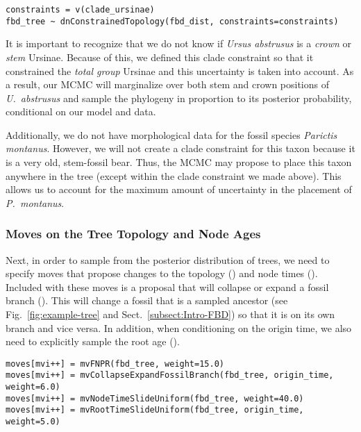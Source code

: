 {\tt \begin{snugshade*}
\begin{lstlisting}
constraints = v(clade_ursinae)
fbd_tree ~ dnConstrainedTopology(fbd_dist, constraints=constraints)
\end{lstlisting}
\end{snugshade*}}

It is important to recognize that we do not know if \textit{Ursus abstrusus} is a \textit{crown} or \textit{stem} Ursinae. 
Because of this, we defined this clade constraint so that it constrained the \textit{total group} Ursinae and this uncertainty is taken into account.
As a result, our MCMC will marginalize over both stem and crown positions of \textit{U.\ abstrusus} and sample the phylogeny in proportion to its posterior probability, conditional on our model and data.

Additionally, we do not have morphological data for the fossil species \textit{Parictis montanus}.
However, we will not create a clade constraint for this taxon because it is a very old, stem-fossil bear. 
Thus, the MCMC may propose to place this taxon anywhere in the tree (except within the clade constraint we made above). 
This allows us to account for the maximum amount of uncertainty in the placement of \textit{P.\ montanus}.

\subsubsection{Moves on the Tree Topology and Node Ages}\label{subsub:Exercise-FBD-TreeMoves}

Next, in order to sample from the posterior distribution of trees, we need to specify moves that propose changes to the topology () and node times ().
Included with these moves is a proposal that will collapse or expand a fossil branch ().
This will change a fossil that is a sampled ancestor (see Fig.\ \ref{fig:example-tree} and Sect.\ \ref{subsect:Intro-FBD}) so that it is on its own branch and vice versa.
In addition, when conditioning on the origin time, we also need to explicitly sample the root age ().
{\tt \begin{snugshade*}
\begin{lstlisting}
moves[mvi++] = mvFNPR(fbd_tree, weight=15.0)
moves[mvi++] = mvCollapseExpandFossilBranch(fbd_tree, origin_time, weight=6.0)
moves[mvi++] = mvNodeTimeSlideUniform(fbd_tree, weight=40.0)
moves[mvi++] = mvRootTimeSlideUniform(fbd_tree, origin_time, weight=5.0)
\end{lstlisting}
\end{snugshade*}}

